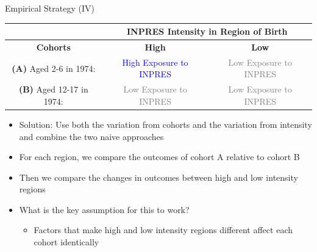 \documentclass[11pt,notes=hide,aspectratio=169,mathserif]{beamer}
\begin{document}
\begin{frame}{Empirical Strategy (IV)}
\begin{table}
\scriptsize
\centering
\begin{tabular}{|c|c|c|}
\hline
    & \multicolumn{2}{|c|}{\textbf{INPRES Intensity in Region of Birth}}  \\
    \hline
    \textbf{Cohorts} & \textbf{High} & \textbf{Low}  \\
\hline 
\textbf{(A)} Aged 2-6 in 1974:  & \rule{0pt}{15pt}  \textcolor{blue}{High Exposure to INPRES} & \rule{0pt}{15pt} \textcolor{gray}{Low Exposure to INPRES} \\
\hline
\textbf{(B)} Aged 12-17 in 1974:  & \rule{0pt}{15pt} \textcolor{gray}{Low Exposure to INPRES} & \rule{0pt}{15pt} \textcolor{gray}{Low Exposure to INPRES} \\
\hline
\end{tabular}
\end{table}

\begin{itemize}
    \item  Solution: Use both the variation from cohorts and the variation from intensity and combine the two naive approaches
    \item  For each region, we compare the outcomes of cohort A relative to cohort B
    \item  Then we compare the changes in outcomes between high and low intensity regions
    \item  What is the key assumption for this to work?
    \begin{itemize}
        \item Factors that make high and low intensity regions different affect each cohort identically 
    \end{itemize} 
\end{itemize}
\end{frame}
\end{document}
